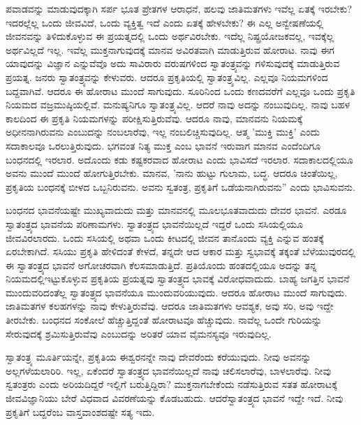 ಪವಾಡವನ್ನು ಮಾಡುವುದಕ್ಕಾಗಿ ಸರ್ಪ ಭೂತ ಪ್ರೇತಗಳ ಆರಾಧನೆ, ಹಲವು ಜಾತಿಮತಗಳು ಇವೆಲ್ಲ ಏತಕ್ಕೆ ಇರಬೇಕು? ಇದರಲ್ಲೆಲ್ಲ ಒಂದು ಜೀವವಿದೆ, ಒಂದು ವ್ಯಕ್ತಿತ್ವ ಇದೆ ಎಂದು ಏತಕ್ಕೆ ಹೇಳಬೇಕು? ಈ ಎಲ್ಲ ಅನ್ವೇಷಣೆಯಲ್ಲಿ ಜೀವನವನ್ನು ತಿಳಿದುಕೊಳ್ಳುವ ಈ ಪ್ರಯತ್ನದಲ್ಲಿ ಒಂದು ಅರ್ಥವಿರಬೇಕು. ಇದೆಲ್ಲ ನಿಷ್ಪ್ರಯೋಜಕವಲ್ಲ, ಇವಕ್ಕೆಲ್ಲ ಅರ್ಥವಿಲ್ಲದೆ ಇಲ್ಲ. ಇವೆಲ್ಲ ಮುಕ್ತನಾಗುವುದಕ್ಕೆ ಮಾನವ ಅವಿರತವಾಗಿ ಮಾಡುತ್ತಿರುವ ಹೋರಾಟ. ನಾವು ಈಗ ಯಾವುದನ್ನು ವಿಜ್ಞಾನ ಎನ್ನುವೆವೊ ಅದು ಸಾವಿರಾರು ವರುಷಗಳಿಂದ ಸ್ವಾತಂತ್ರ್ಯವನ್ನು ಗಳಿಸುವುದಕ್ಕೆ ಮಾಡುತ್ತಿರುವ ಪ್ರಯತ್ನ. ಜನರು ಸ್ವಾತಂತ್ರ್ಯವನ್ನು ಕೇಳುವರು. ಆದರೂ ಪ್ರಕೃತಿಯಲ್ಲಿ ಸ್ವಾತಂತ್ರ್ಯವಿಲ್ಲ. ಎಲ್ಲವೂ ನಿಯಮಗಳಿಂದ ಬದ್ದವಾಗಿವೆ. ಆದರೂ ಈ ಹೋರಾಟ ಮುಂದೆ ಸಾಗುವುದು. ಸೂರಿನಿಂದ ಒಂದು ಕಣದವರೆಗೆ ಎಲ್ಲವೂ ಒಂದು ಪ್ರಕೃತಿ ನಿಯಮದ ವಜ್ರಮುಷ್ಠಿಯಲ್ಲಿವೆ. ಮನುಷ್ಯನಿಗೂ ಸ್ವಾತಂತ್ರ್ಯವಿಲ್ಲ. ಆದರೆ ನಾವು ಅದನ್ನು ನಂಬುವುದಿಲ್ಲ. ನಾವು ಬಹಳ ಕಾಲದಿಂದ ಈ ಪ್ರಕೃತಿ ನಿಯಮಗಳನ್ನು ಪರೀಕ್ಷಿಸುತ್ತಿರುವೆವು. ಆದರೂ ನಾವು, ಮಾನವನು ನಿಯಮಕ್ಕೆ ಅಧೀನನಾಗಿರುವನು ಎಂಬುದನ್ನು ನಂಬಲಾರೆವು, ಇಲ್ಲ ನಂಬಲಿಚ್ಚಿಸುವುದಿಲ್ಲ. ಆತ್ಮ 'ಮುಕ್ತಿ ಮುಕ್ತಿ' ಎಂದು ಸದಾಕಾಲವೂ ಒರಲುತ್ತಿರುವುದು. ಭಗವಂತ ನಿತ್ಯ ಮುಕ್ತ ಎಂಬ ಭಾವನೆ ಇರುವಾಗ ಮಾನವ ಎಂದೆಂದಿಗೂ ಬಂಧನದಲ್ಲಿ ಇರಲಾರ. ಅದೊಂದು ಕಡು ಕಷ್ಟಕರವಾದ ಹೋರಾಟ ಎಂದು ಭಾವಿಸದೆ ಇರಲಾರ. ಸದಾಕಾಲದಲ್ಲಿಯೂ ಅವನು ಮುಂದೆ ಮುಂದೆ ಹೋಗುತ್ತಿರಬೇಕು. ಮಾನವ, 'ನಾನು ಹುಟ್ಟು ಗುಲಾಮ, ಬದ್ಧ. ಆದರೂ ಚಿಂತೆಯಿಲ್ಲ, ಪ್ರಕೃತಿಯ ಬಂಧನಕ್ಕೆ ಬೀಳದ ಒಬ್ಬನಿರುವನು. ಅವನು ಸ್ವತಂತ್ರ, ಪ್ರಕೃತಿಗೆ ಒಡೆಯನಾಗಿರುವನು'' ಎಂದು ಭಾವಿಸುವನು.

ಬಂಧನದ ಭಾವನೆಯಷ್ಟೇ ಮುಖ್ಯವಾದುದು ಮತ್ತು ಮಾನವನಲ್ಲಿ ಮೂಲಭೂತವಾದುದು ದೇವರ ಭಾವನೆ. ಎರಡೂ ಸ್ವಾತಂತ್ರ್ಯದ ಭಾವನೆಯ ಪರಿಣಾಮಗಳು. ಸ್ವಾತಂತ್ರ್ಯದ ಭಾವನೆಯಿಲ್ಲದೆ ಇದ್ದರೆ ಒಂದು ಸಸಿಯಲ್ಲಿಯೂ ಜೀವವಿರಲಾರದು. ಒಂದು ಸಸಿಯಲ್ಲಿ ಅಥವಾ ಒಂದು ಕೀಟದಲ್ಲಿ ಜೀವನ ತಾನೊಂದು ವ್ಯಕ್ತಿ ಎನ್ನುವ ಹಂತಕ್ಕೆ ಏರಬೇಕಾಗಿದೆ. ಸಸಿಯು ಪ್ರಕೃತಿ ಹೇಳಿದಂತೆ ಕೇಳದೆ, ತನ್ನದೇ ಆದ ಆಕಾರ ಮತ್ತು ಸ್ವಭಾವಕ್ಕೆ ತಕ್ಕಂತೆ ಬೆಳೆಯುವುರದಲ್ಲಿ ಈ ಸ್ವಾತಂತ್ರ್ಯದ ಭಾವನೆ ಅಗೋಚರವಾಗಿ ಕೆಲಸಮಾಡುತ್ತಿದೆ. ಪ್ರತಿಯೊಂದು ಹಂತದಲ್ಲಿಯೂ ಅದನ್ನು ತನ್ನ ನಿಯಮದಲ್ಲಿ\break ಇಟ್ಟುಕೊಳ್ಳುವ ಪ್ರಕೃತಿಯ ಪ್ರಯತ್ನವು ಸ್ವಾತಂತ್ರ್ಯದ ಭಾವಕ್ಕೆ ವಿರೋಧವಾದುದು. ಬಾಹ್ಯ ಜಗತ್ತಿನ ಭಾವನೆ ಮುಂದುವರಿದಂತೆಲ್ಲ ಸ್ವಾತಂತ್ರ್ಯದ ಭಾವನೆಯೂ ಮುಂದುವರಿಯುವುದು. ಆದರೂ ಹೋರಾಟ ಮುಂದೆ ಸಾಗುವುದು. ಜಾತಿಮತಗಳ ಕಲಹಗಳನ್ನು ನಾವು ಕೇಳುತ್ತಿರುವೆವು. ಆದರೂ ಜಾತಿಮತಗಳು ಆವಶ್ಯಕ, ಅವು ಸರಿ, ಅವು ಇದ್ದೇ ತೀರಬೇಕು. ಬಂಧನದ ಸಂಕೋಲೆ ಹೆಚ್ಚುತ್ತಿದ್ದಂತೆ ಹೋರಾಟವೂ ಹೆಚ್ಚುವುದು. ನಾವೆಲ್ಲ ಒಂದೇ ಗುರಿಯನ್ನು ಸೇರುವುದಕ್ಕೆ ಶ್ರಮಿಸುತ್ತಿರುವೆವು ಎಂಬುದನ್ನು ಅರಿತರೆ ಯಾವ ವೈಮನಸ್ಯವೂ ಇರುವುದಿಲ್ಲ.

ಸ್ವಾತಂತ್ರ್ಯ ಮೂರ್ತಿಯನ್ನೇ, ಪ್ರಕೃತಿಯ ಈಶ್ವರನನ್ನೇ ನಾವು ದೇವರೆಂದು ಕರೆಯುವುದು. ನೀವು ಅವನನ್ನು ಅಲ್ಲಗಳೆಯಲಾರಿರಿ. ಇಲ್ಲ, ಏಕೆಂದರೆ ಸ್ವಾತಂತ್ರ್ಯದ ಭಾವನೆಯಿಲ್ಲದೆ ನಾವು ಚಲಿಸಲಾರೆವು, ಬಾಳಲಾರೆವು. ನೀವು ಸ್ವತಂತ್ರರು ಎಂದು ಅರಿಯದಿದ್ದರೆ ಇಲ್ಲಿಗೆ ಬರುತ್ತಿದ್ದಿರಾ? ಮುಕ್ತನಾಗಬೇಕೆಂದು ನಡೆಸುತ್ತಿರುವ ಸತತ ಹೋರಾಟಕ್ಕೆ ಜೀವವಿಜ್ಞಾನಿಯು ಬೇರೆ ವಿಧವಾದ ವಿವರಣೆಯನ್ನು ಕೊಡಬಹುದು. ಆದರೆ\break ಸ್ವಾತಂತ್ರ್ಯದ ಭಾವನೆ ಇದ್ದೇ ಇದೆ. ನೀವು ಪ್ರಕೃತಿಗೆ ಬದ್ದರೆಂಬ ವಾಸ್ತವಾಂಶದಷ್ಟೇ ಸತ್ಯ ಇದು.

